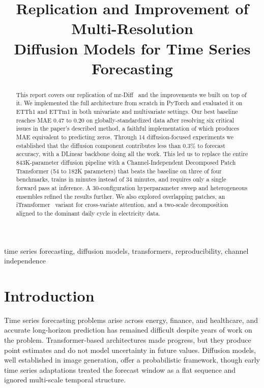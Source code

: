 \documentclass[conference]{IEEEtran}
\begin{document}
\title{Replication and Improvement of Multi-Resolution\\ Diffusion Models for Time Series Forecasting}

\author{
\and
{}
}

\maketitle
\thispagestyle{plain}
\pagestyle{plain}

\begin{abstract}
This report covers our replication of mr-Diff~\cite{mrdiff} and the improvements we built on top of it. We implemented the full architecture from scratch in PyTorch and evaluated it on ETTh1 and ETTm1 in both univariate and multivariate settings. Our best baseline reaches MAE 0.47 to 0.20 on globally-standardized data after resolving six critical issues in the paper's described method, a faithful implementation of which produces MAE equivalent to predicting zeros. Through 14 diffusion-focused experiments we established that the diffusion component contributes less than 0.3\% to forecast accuracy, with a DLinear backbone doing all the work. This led us to replace the entire 843K-parameter diffusion pipeline with a Channel-Independent Decomposed Patch Transformer (54 to 182K parameters) that beats the baseline on three of four benchmarks, trains in minutes instead of 34 minutes, and requires only a single forward pass at inference. A 30-configuration hyperparameter sweep and heterogeneous ensembles refined the results further. We also explored overlapping patches, an iTransformer~\cite{itransformer} variant for cross-variate attention, and a two-scale decomposition aligned to the dominant daily cycle in electricity data.
\end{abstract}

\begin{IEEEkeywords}
time series forecasting, diffusion models, transformers, reproducibility, channel independence
\end{IEEEkeywords}

\section{Introduction}
Time series forecasting problems arise across energy, finance, and healthcare, and accurate long-horizon prediction has remained difficult despite years of work on the problem. Transformer-based architectures made progress, but they produce point estimates and do not model uncertainty in future values. Diffusion models, well established in image generation, offer a probabilistic framework, though early time series adaptations treated the forecast window as a flat sequence and ignored multi-scale temporal structure.
\end{document}
